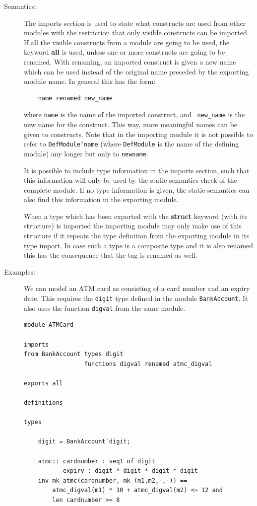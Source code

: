 \documentclass{overturerepchap}
\newcommand{\keyw}[1]{{\bf\ttfamily #1}}
\begin{document}
\begin{description}
\item[Semantics:] The imports section is used to state what constructs are
  used from other modules with the restriction that only visible constructs
  can be imported. If all the visible constructs from a
  module are going to be used, the keyword \keyw{all} is used, unless one or
  more constructs are going to be renamed. With renaming, an imported
  construct is given a new name
  which can be used instead of the original name preceded by the
  exporting module name. In general this has the form:
  \begin{lstlisting}
    name renamed new_name
  \end{lstlisting}
  where {\tt name} is the name of the imported construct, and {\tt
    new\_name} is the new name for the construct. This way,
  more meaningful names can be given to constructs. Note that in the importing
  module it is not possible to refer to {\tt DefModule`name} (where
  {\tt DefModule} is the name of the defining module) any longer but only to
  {\tt newname}.

  It is possible to include type information in the imports section,
such that
  this information will only be used by the static semantics check of the
  complete module. If no type information is given, the static semantics
  can also find this information in the exporting module.
  
  When a type which has been exported with the \keyw{struct} keyword
  (with its structure) is imported the
  importing module may only make use of this structure if it repeats
  the type definition from the exporting module in its type import. In
  case such a type is a composite type and it is also renamed this has
  the consequence that the tag is renamed as well.
  
\item[Examples:] We can model an ATM card as consisting of a
card number and an expiry date. This requires the \texttt{digit} type
defined in the module \texttt{BankAccount}. It also uses the function
\texttt{digval} from the same module.
\begin{lstlisting}
module ATMCard

imports
from BankAccount types digit 
                 functions digval renamed atmc_digval

exports all

definitions

types

    digit = BankAccount`digit;

    atmc:: cardnumber : seq1 of digit
           expiry : digit * digit * digit * digit
    inv mk_atmc(cardnumber, mk_(m1,m2,-,-)) ==
        atmc_digval(m1) * 10 + atmc_digval(m2) <= 12 and
        len cardnumber >= 8


\end{lstlisting}
\end{description}
\end{document}
